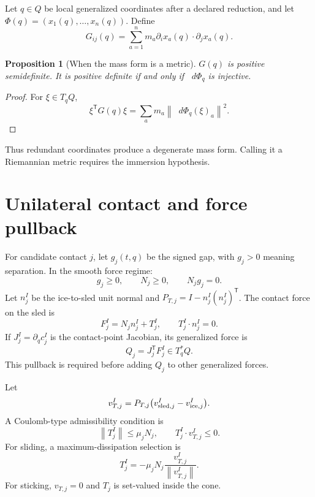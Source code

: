 \documentclass[11pt,a4paper]{article}
\theoremstyle{definition}
\theoremstyle{plain}
\newtheorem{proposition}[definition]{Proposition}
\theoremstyle{remark}
\newcommand{\dd}{\mathop{}\!d}
\newcommand{\norm}[1]{\left\lVert #1\right\rVert}
\begin{document}
Let \(q\in Q\) be local generalized coordinates after a declared
reduction, and let
\(\Phi(q)=(x_1(q),\ldots,x_n(q))\). Define
\begin{equation}\label{eq:mass-form}
G_{ij}(q)=\sum_{a=1}^nm_a
\partial_i x_a(q)\cdot\partial_jx_a(q).
\end{equation}

\begin{proposition}[When the mass form is a metric]
\(G(q)\) is positive semidefinite. It is positive definite if and only
if \(\dd\Phi_q\) is injective.
\end{proposition}

\begin{proof}
For \(\xi\in T_qQ\),
\[
\xi^{\mathsf T}G(q)\xi
=\sum_am_a\norm{\dd\Phi_q(\xi)_a}^2.
\]
\end{proof}

Thus redundant coordinates produce a degenerate mass form. Calling it
a Riemannian metric requires the immersion hypothesis.

\section{Unilateral contact and force pullback}

For candidate contact \(j\), let \(g_j(t,q)\) be the signed gap, with
\(g_j>0\) meaning separation. In the smooth force regime:
\begin{equation}\label{eq:comp}
g_j\ge0,\qquad N_j\ge0,\qquad N_jg_j=0.
\end{equation}
Let \(n_j^I\) be the ice-to-sled unit normal and
\(P_{T,j}=I-n_j^I(n_j^I)^{\mathsf T}\). The contact force on the sled
is
\begin{equation}\label{eq:contact-force}
F_j^I=N_jn_j^I+T_j^I,\qquad
T_j^I\cdot n_j^I=0.
\end{equation}
If \(J_j^I=\partial_qc_j^I\) is the contact-point Jacobian, its
generalized force is
\[
Q_j=J_j^{\mathsf T}F_j^I\in T_q^*Q.
\]
This pullback is required before adding \(Q_j\) to other generalized
forces.

Let
\[
v_{T,j}^I
=P_{T,j}\bigl(v_{{\rm sled},j}^I-v_{{\rm ice},j}^I\bigr).
\]
A Coulomb-type admissibility condition is
\begin{equation}\label{eq:friction-cone}
\norm{T_j^I}\le\mu_jN_j,\qquad
T_j^I\cdot v_{T,j}^I\le0.
\end{equation}
For sliding, a maximum-dissipation selection is
\[
T_j^I=-\mu_jN_j
\frac{v_{T,j}^I}{\norm{v_{T,j}^I}}.
\]
For sticking, \(v_{T,j}=0\) and \(T_j\) is set-valued inside the cone.
\end{document}
